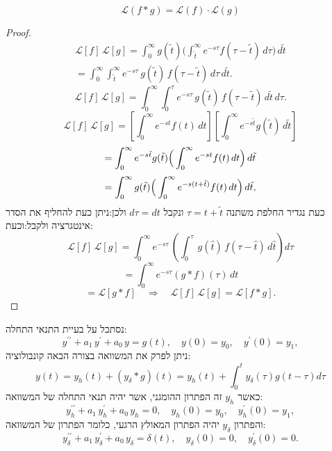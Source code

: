 \documentclass{tstextbook}
\begin{document}
\begin{proposition}
$$\mathcal{L}(f * g) = \mathcal{L}(f) \cdot \mathcal{L}(g)$$

\end{proposition}
\begin{proof}
\begin{gather*}{{{\mathcal{L}}[f]\,{\mathcal{L}}[g]=\int_{0}^{\infty}g(\tilde{t})\Big(\int_{\tilde{t}}^{\infty}e^{-s\tau}f(\tau-\tilde{t})\,d\tau\Big)\,d\tilde{t}}}\\ {{=\int_{0}^{\infty}\int_{\tilde{t}}^{\infty}e^{-s\tau}\,g(\tilde{t})\,f(\tau-\tilde{t})\,d\tau\,d\tilde{t}.}}\end{gather*}$${\mathcal{L}}[f]\,{\mathcal{L}}[g]=\int_{0}^{\infty}\int_{0}^{\tau}e^{-s\tau}\,g(\tilde{t})\,f(\tau-\tilde{t})\,d\tilde{t}\,d\tau.$$$$\mathcal{L}[f]\,\mathcal{L}[g]=\left[\int_{0}^{\infty}e^{-s t}f(t)\,d t\right]\left[\int_{0}^{\infty}e^{-s\tilde{t}}g(\tilde{t})\,d\tilde{t}\right]$$$$=\int_{0}^{\infty}e^{-s\tilde{t}}g(\tilde{t})\Big{(}\int_{0}^{\infty}e^{-s t}f(t)\,d t\Big{)}\,d\tilde{t}$$$$=\int_{0}^{\infty}g(\tilde{t})\Big{(}\int_{0}^{\infty}e^{-s(t+\tilde{t})}f(t)\,d t\Big{)}\,d\tilde{t},$$כעת נגדיר החלפת משתנה \(\tau=t+\tilde{t}\) ונקבל \(d\tau=dt\) ולכן:ניתן כעת להחליף את הסדר אינטגרציה ולקבל:וכעת:
$$\mathcal{L}[f]\,\mathcal{L}[g]=\int_{0}^{\infty}e^{-s\tau}\,\left(\int_{0}^{\tau}\,g(\hat{t})\,f(\tau-\hat{t})\,d\hat{t}\right)d\tau$$$$=\int_{0}^{\infty}e^{-s\tau}(g*f)(\tau)\,dt$$$$=\mathcal{L}[g*f]\quad\Rightarrow\quad\mathcal{L}[f]\,\mathcal{L}[g]=\mathcal{L}[f*g].$$

\end{proof}
\begin{proposition}
נסתכל על בעיית התנאי התחלה:
$$y^{\prime\prime}+a_{1}\,y^{\prime}+a_{0}\,y=g(t),\quad y(0)=y_{0},\quad y^{\prime}(0)=y_{1},$$
ניתן לפרק את המשוואה בצורה הבאה קונבולוציה:
$$y(t)=y_{h}(t)+\left( y_{\delta}*g \right)(t)=y_{h}(t)+\int_{0}^{t}y_{\delta}\left( \tau \right)g\left( t-\tau \right)d\tau$$
כאשר \(y_{h}\) זה הפתרון ההומגני, אשר יהיה תנאי התחלה של המשוואה:
$$y_{h}^{\prime\prime}+a_{1}\,y_{h}^{\prime}+a_{0}\,y_{h}=0,\quad y_{h}(0)=y_{0},\quad y_{h}^{\prime}(0)=y_{1},$$
והפתרון \(y_{\delta}\) יהיה הפתרון המאולץ הרגעי, כלומר הפתרון של המשוואה:
$$y_{\delta}^{\prime\prime}+a_{1}\,y_{\delta}^{\prime}+a_{0}\,y_{\delta}=\delta(t),\quad y_{\delta}(0)=0,\quad y_{\delta}^{\prime}(0)=0.$$

\end{proposition}
\end{document}
